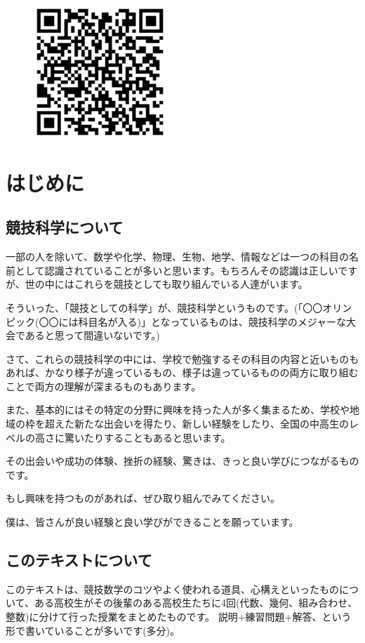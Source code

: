 \documentclass[uplatex,dvipdfmx]{jsbook}
\begin{document}
\tableofcontents

\begin{figure}[b]
    \includegraphics[clip,width=5cm]{figures/JMOTextbook.jpg}
\end{figure}

\chapter{はじめに}
\section{競技科学について}
一部の人を除いて、数学や化学、物理、生物、地学、情報などは一つの科目の名前として認識されていることが多いと思います。もちろんその認識は正しいですが、世の中にはこれらを競技としても取り組んでいる人達がいます。

そういった、「競技としての科学」が、競技科学というものです。(「〇〇オリンピック(〇〇には科目名が入る)」となっているものは、競技科学のメジャーな大会であると思って間違いないです。)

さて、これらの競技科学の中には、学校で勉強するその科目の内容と近いものもあれば、かなり様子が違っているもの、様子は違っているものの両方に取り組むことで両方の理解が深まるものもあります。

また、基本的にはその特定の分野に興味を持った人が多く集まるため、学校や地域の枠を超えた新たな出会いを得たり、新しい経験をしたり、全国の中高生のレベルの高さに驚いたりすることもあると思います。

その出会いや成功の体験、挫折の経験、驚きは、きっと良い学びにつながるものです。

もし興味を持つものがあれば、ぜひ取り組んでみてください。

僕は、皆さんが良い経験と良い学びができることを願っています。

\section{このテキストについて}
このテキストは、競技数学のコツやよく使われる道具、心構えといったものについて、ある高校生がその後輩のある高校生たちに4回(代数、幾何、組み合わせ、整数)に分けて行った授業をまとめたものです。
説明+練習問題+解答、という形で書いていることが多いです(多分)。
\end{document}
